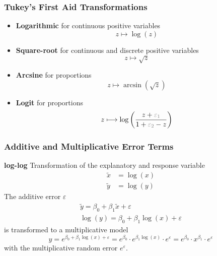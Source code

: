 \documentclass[11pt]{article}
\theoremstyle{definition}
\begin{document}
\subsubsection{Tukey's First Aid Transformations}
\begin{itemize}
	\item \textbf{Logarithmic} for continuous positive variables\\
	\begin{equation*}
		z \longmapsto \log(z)
	\end{equation*}
	\item \textbf{Square-root} for continuous and discrete positive variables\\
	\begin{equation*}
		z \longmapsto \sqrt{z}
	\end{equation*}
	\item \textbf{Arcsine} for proportions\\
	\begin{equation*}
		z \longmapsto \arcsin(\sqrt{z})
	\end{equation*}
	\item \textbf{Logit} for proportions\\
	\begin{equation*}
		z \longmapsto \log\left(\frac{z+{\color{gray}\varepsilon_1}}{1+{\color{gray}\varepsilon_2}-z}\right)
	\end{equation*}
\end{itemize}

\subsubsection{Additive and Multiplicative Error Terms}
\textbf{log-log} Transformation of the explanatory and response variable
\begin{align*}
	\tilde{x} &= \log(x)\\
	\tilde{y} &= \log(y)
\end{align*}
The additive error $\varepsilon$
\begin{align*}
	\tilde{y} = \beta_0 + \beta_1 \tilde{x} + \varepsilon\\
	\log(y) = \beta_0 + \beta_1 \log(x) + \varepsilon
\end{align*}
is transformed to a multiplicative model
\begin{equation*}
	y = e^{\beta_0 + \beta_1 \log(x) + \varepsilon} = e^{\beta_0}\cdot e^{\beta_1\log(x)}\cdot e^{\varepsilon}  =e^{\beta_0}\cdot x^{\beta_1}\cdot e^{\varepsilon}
\end{equation*}
with the multiplicative random error $e^\varepsilon$.
\end{document}
